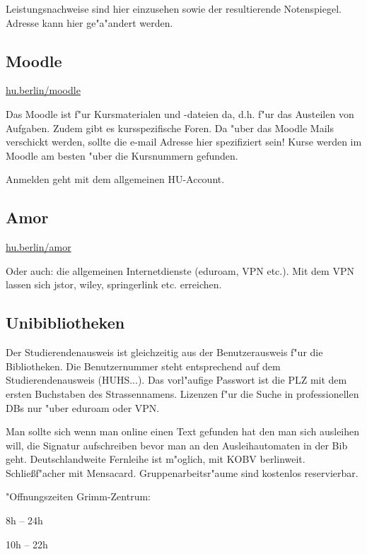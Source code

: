 \documentclass[]{scrartcl}
\begin{document}
Leistungsnachweise sind hier einzusehen sowie der resultierende Notenspiegel. Adresse kann hier ge"a"andert werden.

\subsection{Moodle}
\url{hu.berlin/moodle}
\newline

Das Moodle ist f"ur Kursmaterialen und -dateien da, d.h. f"ur das Austeilen von Aufgaben. Zudem gibt es kursspezifische Foren. Da "uber das Moodle Mails verschickt werden, sollte die e-mail Adresse hier spezifiziert sein! Kurse werden im Moodle am besten "uber die Kursnummern gefunden.

Anmelden geht mit dem allgemeinen HU-Account. 

\subsection{Amor}
\url{hu.berlin/amor}
\newline

Oder auch: die allgemeinen Internetdienste (eduroam, VPN etc.).
Mit dem VPN lassen sich jstor, wiley, springerlink etc. erreichen.

\subsection{Unibibliotheken}

Der Studierendenausweis ist gleichzeitig aus der Benutzerausweis f"ur die Bibliotheken. Die Benutzernummer steht entsprechend auf dem Studierendenausweis (HUHS...). Das vorl"aufige Passwort ist die PLZ mit dem ersten Buchstaben des Strassennamens. Lizenzen f"ur die Suche in professionellen DBs nur "uber eduroam oder VPN.

Man sollte sich wenn man online einen Text gefunden hat den man sich ausleihen will, die Signatur aufschreiben bevor man an den Ausleihautomaten in der Bib geht. Deutschlandweite Fernleihe ist m"oglich, mit KOBV berlinweit. Schließf"acher mit Mensacard. Gruppenarbeitsr"aume sind kostenlos reservierbar.

"Offnungszeiten Grimm-Zentrum:

\begin{description}[leftmargin=!,labelwidth=\widthof{\bfseries Mo - Fr}]
  \item[Mo - Fr]  8h -- 24h
  \item[Sa - So] 10h -- 22h
\end{description}
\end{document}
